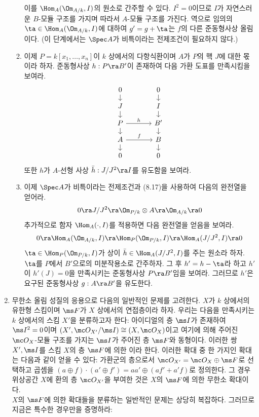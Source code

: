 \begin{enumerate}[label=\tb{8.\arabic*.},itemindent=0mm,itemsep=2mm]
\begin{enumerate}[label=(\alph*)]
	이를 $\Hom_A(\Om_{A/k},I)$의 원소로 간주할 수 있다.
	$I^2=0$이므로 $I$가 자연스러운 $B$-모듈 구조를 가지며 따라서 $A$-모듈 구조를 가진다.
	역으로 임의의 $\ta\in\Hom_A(\Om_{A/k},I)$에 대하여 $g'=g+\ta$는 $f$의 다른 준동형사상 올림이다.
	(이 단계에서는 $\Spec A$가 비특이라는 전제조건이 필요하지 않다.)
	\item 이제 $P=k[x_1,\ldots,x_n]$이 $k$ 상에서의 다항식환이며 $A$가 $P$의 핵 $J$에 대한 몫이라 하자.
	준동형사상 $h:P\ra B'$이 존재하여 다음 가환 도표를 만족시킴을 보여라.
	$$\begin{tikzcd}[row sep=small,column sep=large]
	0\arrow[d]&0\arrow[d]\\J\arrow[d]&I\arrow[d]\\P\arrow[d]\arrow[r,"h"]&B'\arrow[d]\\
	A\arrow[d]\arrow[r,"f"]&B\arrow[d]\\0&0\end{tikzcd}$$
	또한 $h$가 $A$-선형 사상 $\bar h:J/J^2\ra I$를 유도함을 보여라.
	\item 이제 $\Spec A$가 비특이라는 전제조건과 (8.17)을 사용하여 다음의 완전열을 얻어라.
	$$0\ra J/J^2\ra\Om_{P/k}\otimes A\ra\Om_{A/k}\ra 0$$
	추가적으로 함자 $\Hom_A(\cdot,I)$를 적용하면 다음 완전열을 얻음을 보여라.
	$$0\ra\Hom_A(\Om_{A/k},I)\ra\Hom_P(\Om_{P/k},I)\ra\Hom_A(J/J^2,I)\ra 0$$
	$\ta\in\Hom_P(\Om_{P/k},I)$가 상이 $\bar h\in\Hom_A(J/J^2,I)$를 주는 원소라 하자.
	$\ta$를 $P$에서 $B'$으로의 미분작용소로 간주하자. 그 후 $h'=h-\ta$라 하고 $h'$이 $h'(J)=0$을 만족시키는 준동형사상 $P\ra B'$임을 보여라.
	그러므로 $h'$은 요구된 준동형사상 $g:A\ra B'$을 유도한다.
	\end{enumerate}
	\item 무한소 올림 성질의 응용으로 다음의 일반적인 문제를 고려한다.
	$X$가 $k$ 상에서의 유한형 스킴이며 $\ms F$가 $X$ 상에서의 연접층이라 하자.
	우리는 다음을 만족시키는 $k$ 상에서의 스킴 $X'$을 분류하고자 한다:
	아이디얼의 층 $\ms I$가 존재하여 $\ms I^2=0$이며 $(X',\mc O_{X'}/\ms I)\cong(X,\mc O_X)$이고
	여기에 의해 주어진 $\mc O_X$-모듈 구조를 가지는 $\ms I$가 주어진 층 $\ms F$와 동형이다.
	이러한 쌍 $X',\ms I$를 스킴 $X$의 층 $\ms F$에 의한 이라 한다.
	이러한 확대 중 한 가지인  확대는 다음과 같이 얻을 수 있다:
	가환군의 층으로서 $\mc O_{X'}=\mc O_X\oplus\ms F$로 선택하고 곱셈을 $(a\oplus f)\cdot(a'\oplus f')=aa'\oplus(af'+a'f)$로 정의한다.
	그 경우 위상공간 $X$에 환의 층 $\mc O_{X'}$을 부여한 것은 $X$의 $\ms F$에 의한 무한소 확대이다.\\
	$X$의 $\ms F$에 의한 확대들을 분류하는 일반적인 문제는 상당히 복잡하다. 그러므로 지금은 특수한 경우만을 증명하라:

\end{enumerate}
